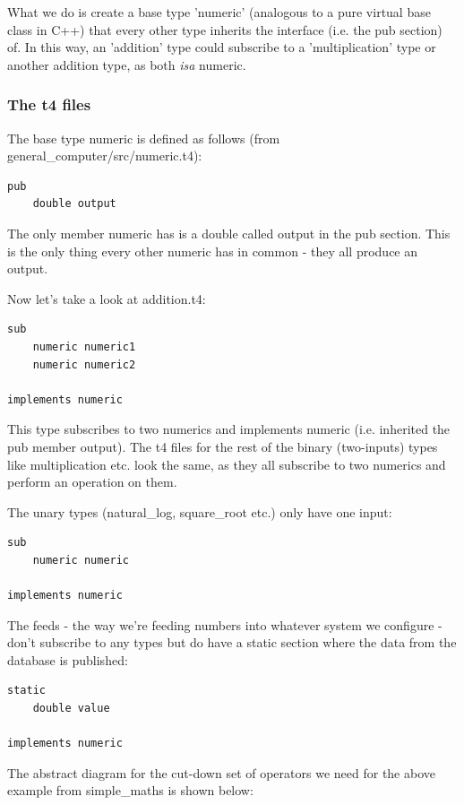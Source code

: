 \documentclass{report}
\begin{document}
What we do is create a base type 'numeric' (analogous to a pure virtual base class in C++) that every other type inherits the interface (i.e. the pub section) of. In this way, an 'addition' type could subscribe to a 'multiplication' type or another addition type, as both \emph{isa} numeric.

\subsubsection{The t4 files}

The base type numeric is defined as follows (from general_computer/src/numeric.t4):

\begin{verbatim}
pub
    double output
\end{verbatim}

The only member numeric has is a double called output in the pub section. This is the only thing every other numeric has in common - they all produce an output.

Now let's take a look at addition.t4:

\begin{verbatim}
sub
    numeric numeric1
    numeric numeric2

implements numeric
\end{verbatim}

This type subscribes to two numerics and implements numeric (i.e. inherited the pub member output). The t4 files for the rest of the binary (two-inputs) types like multiplication etc. look the same, as they all subscribe to two numerics and perform an operation on them.

The unary types (natural_log, square_root etc.) only have one input:

\begin{verbatim}
sub
    numeric numeric

implements numeric
\end{verbatim}

The feeds - the way we're feeding numbers into whatever system we configure - don't subscribe to any types but do have a static section where the data from the database is published:


\begin{verbatim}
static
    double value

implements numeric
\end{verbatim}

The abstract diagram for the cut-down set of operators we need for the above example from simple_maths is shown below:
\end{document}
